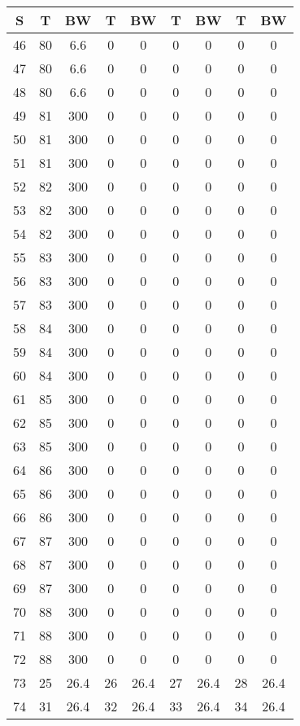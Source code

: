 \begin{center}
\begin{footnotesize}
\begin{tabular}{|c|cccccccc|}
\hline
S & T & BW & T & BW & T & BW & T & BW\\
\hline
46 & 80 & 6.6 & 0 & 0 & 0 & 0 & 0 & 0 \\
47 & 80 & 6.6 & 0 & 0 & 0 & 0 & 0 & 0 \\
48 & 80 & 6.6 & 0 & 0 & 0 & 0 & 0 & 0 \\
49 & 81 & 300 & 0 & 0 & 0 & 0 & 0 & 0 \\
50 & 81 & 300 & 0 & 0 & 0 & 0 & 0 & 0 \\
51 & 81 & 300 & 0 & 0 & 0 & 0 & 0 & 0 \\
52 & 82 & 300 & 0 & 0 & 0 & 0 & 0 & 0 \\
53 & 82 & 300 & 0 & 0 & 0 & 0 & 0 & 0 \\
54 & 82 & 300 & 0 & 0 & 0 & 0 & 0 & 0 \\
55 & 83 & 300 & 0 & 0 & 0 & 0 & 0 & 0 \\
56 & 83 & 300 & 0 & 0 & 0 & 0 & 0 & 0 \\
57 & 83 & 300 & 0 & 0 & 0 & 0 & 0 & 0 \\
58 & 84 & 300 & 0 & 0 & 0 & 0 & 0 & 0 \\
59 & 84 & 300 & 0 & 0 & 0 & 0 & 0 & 0 \\
60 & 84 & 300 & 0 & 0 & 0 & 0 & 0 & 0 \\
61 & 85 & 300 & 0 & 0 & 0 & 0 & 0 & 0 \\
62 & 85 & 300 & 0 & 0 & 0 & 0 & 0 & 0 \\
63 & 85 & 300 & 0 & 0 & 0 & 0 & 0 & 0 \\
64 & 86 & 300 & 0 & 0 & 0 & 0 & 0 & 0 \\
65 & 86 & 300 & 0 & 0 & 0 & 0 & 0 & 0 \\
66 & 86 & 300 & 0 & 0 & 0 & 0 & 0 & 0 \\
67 & 87 & 300 & 0 & 0 & 0 & 0 & 0 & 0 \\
68 & 87 & 300 & 0 & 0 & 0 & 0 & 0 & 0 \\
69 & 87 & 300 & 0 & 0 & 0 & 0 & 0 & 0 \\
70 & 88 & 300 & 0 & 0 & 0 & 0 & 0 & 0 \\
71 & 88 & 300 & 0 & 0 & 0 & 0 & 0 & 0 \\
72 & 88 & 300 & 0 & 0 & 0 & 0 & 0 & 0 \\
73 & 25 & 26.4 & 26 & 26.4 & 27 & 26.4 & 28 & 26.4 \\
74 & 31 & 26.4 & 32 & 26.4 & 33 & 26.4 & 34 & 26.4 \\

\end{tabular}
\end{footnotesize}
\end{center}
